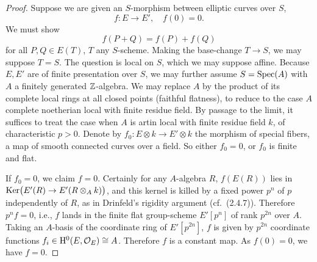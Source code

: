 \begin{proof}
Suppose we are given an $S$-morphism between elliptic curves over $S$,
\[
f : E \longrightarrow E', \quad f(0) = 0.
\]
We must show
\[
f(P + Q) = f(P) + f(Q)
\]
for all $P, Q \in E(T)$, $T$ any $S$-scheme. Making the base-change $T \to S$, we may suppose $T = S$. The question is local on $S$, which we may suppose affine. Because $E, E'$ are of finite presentation over $S$, we may further assume $S = \operatorname{Spec}(A)$ with $A$ a finitely generated $\mathbb{Z}$-algebra. We may replace $A$ by the product of its complete local rings at all closed points (faithful flatness), to reduce to the case $A$ complete noetherian local with finite residue field. By passage to the limit, it suffices to treat the case when $A$ is artin local with finite residue field $k$, of characteristic $p > 0$. Denote by $f_0 : E \otimes k \to E' \otimes k$ the morphism of special fibers, a map of smooth connected curves over a field. So either $f_0 = 0$, or $f_0$ is finite and flat.

If $f_0 = 0$, we claim $f = 0$. Certainly for any $A$-algebra $R$, $f(E(R))$ lies in $\operatorname{Ker}\bigl(E'(R) \to E'(R \otimes_A k)\bigr)$, and this kernel is killed by a fixed power $p^n$ of $p$ independently of $R$, as in Drinfeld's rigidity argument (cf.\ (2.4.7)). Therefore $p^n f = 0$, i.e., $f$ lands in the finite flat group-scheme $E'[p^n]$ of rank $p^{2n}$ over $A$. Taking an $A$-basis of the coordinate ring of $E'[p^{2n}]$, $f$ is given by $p^{2n}$ coordinate functions $f_i \in \mathrm{H}^0(E, \mathcal{O}_E) \cong A$. Therefore $f$ is a constant map. As $f(0) = 0$, we have $f = 0$.


\end{proof}
